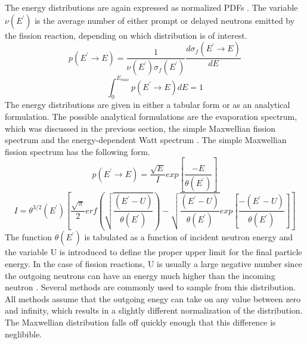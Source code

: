 The energy distributions are again expressed as normalized PDFs
\citep{chadwick_endf/b-vii.1_2011}. The variable $\nu(E^{'})$ is the average 
number of either prompt or delayed neutrons emitted by the fission reaction, 
depending on which distribution is of interest. 
\begin{equation}
  p(E^{'} \to E) = \frac{1}{\nu(E^{'})\sigma_f(E^{'})}
  \frac{d\sigma_f(E^{'} \to E)}{dE}
\end{equation}
\begin{equation}
  \int_0^{E_{max}}p(E^{'} \to E)dE = 1
\end{equation}
The energy distributions are given in either a tabular form or as an analytical
formulation. The possible analytical formulations are the evaporation spectrum, 
which was discussed in the previous section, the simple Maxwellian fission 
spectrum and the energy-dependent Watt spectrum 
\citep{chadwick_endf/b-vii.1_2011}. The simple Maxwellian fission spectrum has 
the following form.
\begin{equation}
  p(E^{'} \to E) = \frac{\sqrt{E}}{I}exp\left[\frac{-E}{\theta(E^{'})}\right]
\end{equation}
\begin{equation}
  I = \theta^{3/2}(E^{'})\left[\frac{\sqrt{\pi}}{2}
    erf\left(\sqrt{\frac{(E^{'}-U)}{\theta(E^{'})}}\right) -
    \sqrt{\frac{(E^{'}-U)}{\theta(E^{'})}}
    exp\left[\frac{-(E^{'}-U)}{\theta(E^{'})}
      \right]\right]
\end{equation}
The function $\theta(E^{'})$ is tabulated as a function of incident neutron
energy and the variable U is introduced to define the proper upper limit for 
the final particle energy. In the case of fission reactions, U is usually a
large negative number since the outgoing neutrons can have an energy much 
higher than the incoming neutron \citep{chadwick_endf/b-vii.1_2011}. Several
methods are commonly used to sample from this distribution. All methods assume
that the outgoing enegy can take on any value between zero and infinity, which
results in a slightly different normalization of the distribution. The
Maxwellian distribution falls off quickly enough that this difference is
neglibible. 

